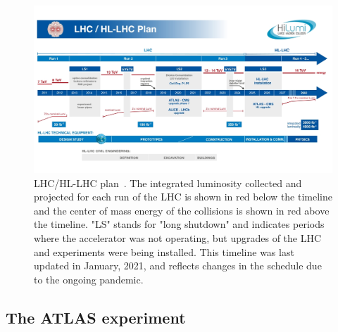 \begin{figure}
    \centering
    \includegraphics[width = \textwidth]{figures/HL-LHC-updated-January-2021_small.jpg}
    \caption{LHC/HL-LHC plan~\cite{hl-lhc_plan_picture_website}. The integrated luminosity collected and projected for each run of the LHC is shown in red below the timeline and the center of mass energy of the collisions is shown in red above the timeline. "LS" stands for "long shutdown" and indicates periods where the accelerator was not operating, but upgrades of the LHC and experiments were being installed. This timeline was last updated in January, 2021, and reflects changes in the schedule due to the ongoing pandemic. }
    \label{fig:hl-lhc}
\end{figure}



\subsection{The ATLAS experiment}
\label{sec:atlas}

